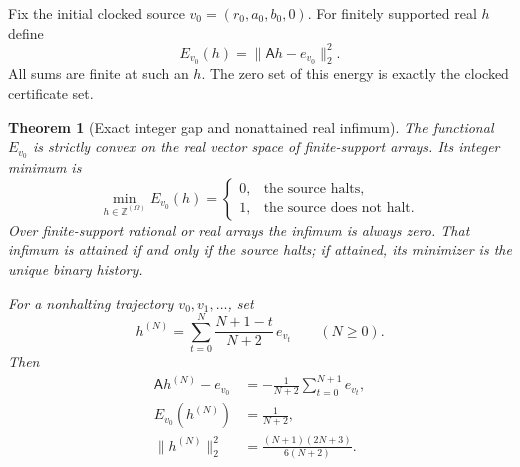 \documentclass[11pt,letterpaper]{article}
\numberwithin{equation}{section}
\newtheorem{theorem}{Theorem}[section]
\theoremstyle{definition}
\newcommand{\Z}{\mathbb Z}
\newcommand{\Ann}{\mathsf{A}}
\begin{document}
Fix the initial clocked source $v_0=(r_0,a_0,b_0,0)$. For finitely
supported real $h$ define
\begin{equation}\label{pwh:bt:eq:energy}
 E_{v_0}(h)=\|\Ann h-e_{v_0}\|_2^2.
\end{equation}
All sums are finite at such an $h$. The zero set of this energy is
exactly the clocked certificate set.

\begin{theorem}[Exact integer gap and nonattained real infimum]\label{pwh:bt:thm:gap}
The functional $E_{v_0}$ is strictly convex on the real vector space of
finite-support arrays. Its integer minimum is
\begin{equation}\label{pwh:bt:eq:integer-gap}
 \min_{h\in\Z^{(\Omega)}}E_{v_0}(h)
 =\begin{cases}0,&\text{the source halts},\\1,&\text{the source does not halt}.
 \end{cases}
\end{equation}
Over finite-support rational or real arrays the infimum is always zero.
That infimum is attained if and only if the source halts; if attained,
its minimizer is the unique binary history.

For a nonhalting trajectory $v_0,v_1,\ldots$, set
\begin{equation}\label{pwh:bt:eq:taper}
 h^{(N)}=\sum_{t=0}^{N}\frac{N+1-t}{N+2}\,e_{v_t}
 \qquad(N\ge0).
\end{equation}
Then
\begin{align}
 \Ann h^{(N)}-e_{v_0}
   &=-\frac{1}{N+2}\sum_{t=0}^{N+1}e_{v_t},\label{pwh:bt:eq:taper-residual}\\
 E_{v_0}(h^{(N)})&=\frac{1}{N+2},\label{pwh:bt:eq:taper-energy}\\
 \|h^{(N)}\|_2^2&=\frac{(N+1)(2N+3)}{6(N+2)}.\label{pwh:bt:eq:taper-norm}
\end{align}
\end{theorem}
\end{document}
